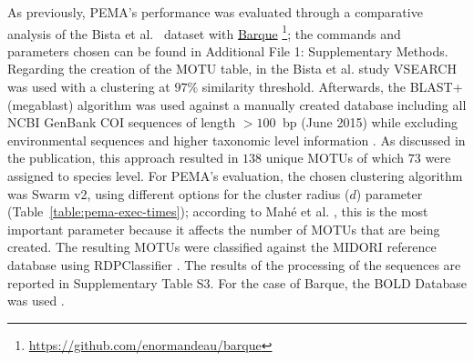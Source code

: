       As previously, PEMA's performance was evaluated through a comparative analysis of the 
      Bista et al.~\cite{bista2017annual} dataset with 
      \href{https://github.com/enormandeau/barque}{Barque} 
      \footnote{
         \href{https://github.com/enormandeau/barque}{https://github.com/enormandeau/barque}
      }; 
      the commands and parameters chosen can be found in Additional File 1: Supplementary Methods. 
      Regarding the creation of the MOTU table, in the Bista et al. \cite{bista2017annual} study VSEARCH \cite{rognes2016vsearch} was used with a clustering at $97\%$ similarity threshold. 
      Afterwards, the BLAST+ (megablast) algorithm \cite{camacho2009blast} was used against a manually created database including all NCBI GenBank COI sequences of length $>100$  bp (June 2015) while excluding environmental sequences and higher taxonomic level information \cite{bista2017annual}. 
      As discussed in the publication, this approach resulted in $138$ unique MOTUs of which $73$ were assigned to species level. 
      For PEMA's evaluation, the chosen clustering algorithm was Swarm v2, using different options for the cluster radius ($d$) parameter (Table~\ref{table:pema-exec-times}); 
      according to Mahé et al. \cite{mahe2015swarm}, this is the most important parameter because it affects the number of MOTUs that are being created. 
      The resulting MOTUs were classified against the MIDORI reference database \cite{machida2017metazoan} using RDPClassifier \cite{wang2007naive}. 
      The results of the processing of the sequences are reported in Supplementary Table S3. 
      For the case of Barque, the BOLD Database was used \cite{ratnasingham2007bold}.



